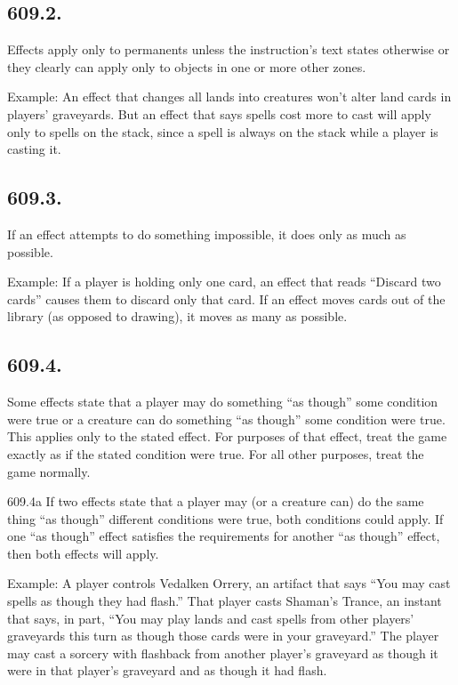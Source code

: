 \subsection*{609.2.}
Effects apply only to permanents unless the instruction’s text states otherwise or they clearly can apply only to objects in one or more other zones.

Example: An effect that changes all lands into creatures won’t alter land cards in players’ graveyards. But an effect that says spells cost more to cast will apply only to spells on the stack, since a spell is always on the stack while a player is casting it.

\subsection*{609.3.}
If an effect attempts to do something impossible, it does only as much as possible.

Example: If a player is holding only one card, an effect that reads “Discard two cards” causes them to discard only that card. If an effect moves cards out of the library (as opposed to drawing), it moves as many as possible.

\subsection*{609.4.}
Some effects state that a player may do something “as though” some condition were true or a creature can do something “as though” some condition were true. This applies only to the stated effect. For purposes of that effect, treat the game exactly as if the stated condition were true. For all other purposes, treat the game normally.

609.4a If two effects state that a player may (or a creature can) do the same thing “as though” different conditions were true, both conditions could apply. If one “as though” effect satisfies the requirements for another “as though” effect, then both effects will apply.

Example: A player controls Vedalken Orrery, an artifact that says “You may cast spells as though they had flash.” That player casts Shaman’s Trance, an instant that says, in part, “You may play lands and cast spells from other players’ graveyards this turn as though those cards were in your graveyard.” The player may cast a sorcery with flashback from another player’s graveyard as though it were in that player’s graveyard and as though it had flash.

